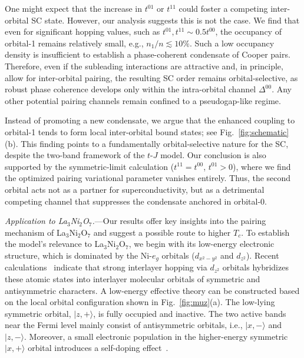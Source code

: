 \documentclass[reprint,superscriptaddress,amsmath,amssymb,aps,twocolumn]{revtex4-1}
\begin{document}
One might expect that the increase in $t^{01}$ or $t^{11}$ could foster a competing inter-orbital SC state. However, our analysis suggests this is not the case. We find that even for significant hopping values, such as $t^{01}, t^{11} \sim 0.5t^{00}$, the occupancy of orbital-1 remains relatively small, e.g., $n_1/n \lesssim 10\%$. 
Such a low occupancy density is insufficient to establish a phase-coherent condensate of Cooper pairs. Therefore, even if the subleading interactions are attractive and, in principle, allow for inter-orbital pairing, the resulting SC order remains orbital-selective, as robust phase coherence develops only within the intra-orbital channel $\Delta^{00}$. 
Any other potential pairing channels remain confined to a pseudogap-like regime.

Instead of promoting a new condensate, we argue that the enhanced coupling to orbital-1 tends to form local inter-orbital bound states; see Fig.~\ref{fig:schematic}(b). This finding points to a fundamentally orbital-selective 
nature for the SC, despite the two-band framework of the $t$-$J$ model. Our conclusion is also supported by the symmetric-limit calculation ($t^{11} = t^{00}$, $t^{01}>0$), where we find the optimized pairing variational parameter vanishes entirely. Thus, the second orbital acts not as a partner for superconductivity, but as a detrimental competing channel that suppresses the condensate anchored in orbital-0.

{\color{blue}\em Application to La$_3$Ni$_2$O$_7$.}---Our results offer key insights into the pairing mechanism of La$_3$Ni$_2$O$_7$ and suggest a possible route to higher $T_c$. To establish the model's relevance to La$_3$Ni$_2$O$_7$, we begin with its low-energy electronic structure, which is dominated by the Ni-$e_g$ orbitals ($d_{x^2-y^2}$ and $d_{z^2}$). Recent calculations~\cite{2024Zhangf,2025Jiang} indicate that strong interlayer hopping via $d_{z^2}$ orbitals hybridizes these atomic states into interlayer molecular orbitals of symmetric and antisymmetric characters. A low-energy effective theory can be constructed based on the local orbital configuration shown in Fig.~\ref{fig:muz}(a). The low-lying symmetric orbital, $|z,+\rangle$, is fully occupied and inactive. The two active bands near the Fermi level mainly consist of antisymmetric orbitals, i.e., $|x,-\rangle$ and $|z,-\rangle$. Moreover, a small electronic population in the higher-energy symmetric $|x,+\rangle$ orbital introduces a self-doping effect~\cite{2025Zhange}. 
\end{document}
